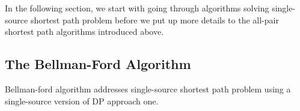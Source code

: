 \documentclass[../main.tex]{subfiles}
\begin{document}





In the following section, we start with going through algorithms solving single-source shortest path problem  before we put up more details to the all-pair shortest path algorithms introduced above.

\subsection{The Bellman-Ford Algorithm}
\label{subsec_bellman_ford}
Bellman-ford algorithm addresses single-source shortest path problem using a single-source version of DP approach one.
\end{document}
